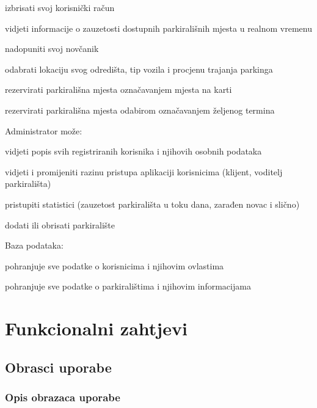 {\begin{packed_enum}
\begin{packed_item}
			\item {izbrisati svoj korisnički račun}
			\item {vidjeti informacije o zauzetosti dostupnih parkirališnih mjesta u realnom vremenu}
			\item {nadopuniti svoj novčanik}
			\item {odabrati lokaciju svog odredišta, tip vozila i procjenu trajanja parkinga}
			\item {rezervirati parkirališna mjesta označavanjem mjesta na karti}
			\item {rezervirati parkirališna mjesta odabirom označavanjem željenog termina}
		\end{packed_item}
		\item {Administrator može:}
		\begin{packed_item}
			\item {vidjeti popis svih registriranih korisnika i njihovih osobnih podataka}
			\item {vidjeti i promijeniti razinu pristupa aplikaciji korisnicima (klijent, voditelj parkirališta)}
			\item {pristupiti statistici (zauzetost parkirališta u toku dana, zarađen novac i slično)}
			\item {dodati ili obrisati parkiralište}
		\end{packed_item}
		\item {Baza podataka:}
		\begin{packed_item}
			\item {pohranjuje sve podatke o korisnicima i njihovim ovlastima}
			\item {pohranjuje sve podatke o parkiralištima i njihovim informacijama}
		\end{packed_item}
	\end{packed_enum}

\section{Funkcionalni zahtjevi}

\subsection{Obrasci uporabe}


\subsubsection{Opis obrazaca uporabe}

}

